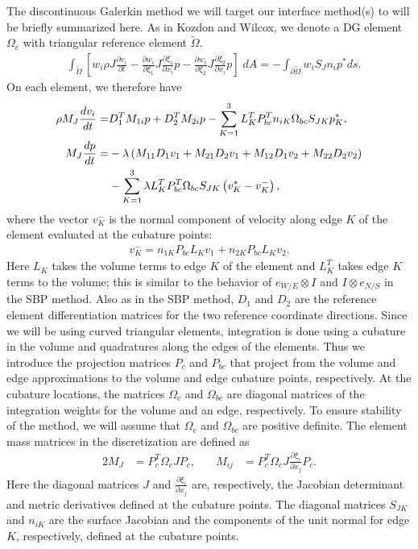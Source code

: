 The discontinuous Galerkin method we will target our interface method(s) to
will be briefly summarized here. As in Kozdon and Wilcox, we denote a DG
element $\Omega_e$ with triangular reference element $\tilde{\Omega}$.
\begin{align}
&\int_{\tilde{\Omega}} \left[ w_{i}\rho J \frac{\partial v_{i}}{\partial t}
- \frac{\partial w_{i}}{\partial \xi_{1}}J\frac{\partial \xi_{1}}{\partial x_{i}} p
- \frac{\partial w_{i}}{\partial \xi_{2}}J\frac{\partial \xi_{2}}{\partial x_{i}} p\right]\;dA
=
-\int_{\partial \tilde{\Omega}} w_{i} S_{J} n_{i} p^*ds.
\end{align}
On each element, we therefore have
\begin{align}
  \rho M_{J} \frac{d v_{i}}{dt} =&
  D_{1}^{T} M_{1i} p
  + D_{2}^{T} M_{2i} p
  - \sum_{K=1}^{3} L_{K}^{T} P_{bc}^{T} n_{iK}
  \Omega_{bc} S_{JK} p_{K}^{*},\\
  \notag
  M_{J} \frac{dp}{dt} =&
  -\lambda\left(
    M_{11} D_{1} v_{1}
    +
    M_{21} D_{2} v_{1}
    +
    M_{12} D_{1} v_{2}
    +
    M_{22} D_{2} v_{2}
  \right)\\
  &- \sum_{K=1}^{3}\lambda L_{K}^{T} P_{bc}^{T} \Omega_{bc}
  S_{JK} \left(v_{K}^* - v_{K}^{-}\right),
\end{align}
where the vector $v_{K}^{-}$ is the normal component of velocity along
edge $K$ of the element evaluated at the cubature points:
\begin{align}
  v^{-}_{K} = n_{1K} P_{bc} L_{K} v_{1}
    + n_{2K} P_{bc} L_{K} v_{2}.
\end{align}
Here $L_{K}$ takes the volume terms to edge $K$ of the element
and $L_{K}^{T}$ takes edge $K$ terms to the volume; this is similar
to the behavior of $e_{W/E} \otimes I$ and  $I \otimes
e_{N/S}$ in the SBP method.
Also as in the SBP method, $D_{1}$ and $D_{2}$ are the reference
element differentiation matrices for the two reference coordinate directions.
Since we will be using curved triangular elements, integration is done using
a cubature in the volume and quadratures along the edges of the elements.
Thus we introduce the projection matrices
$P_{c}$ and $P_{bc}$ that project from the volume and edge
approximations to the volume and edge cubature points, respectively. At the
cubature locations, the matrices $\Omega_{c}$ and $\Omega_{bc}$ are
diagonal matrices of the integration weights for the volume and an edge,
respectively.  To ensure stability of the method, we will assume that
$\Omega_{c}$ and $\Omega_{bc}$ are positive definite. The
element mass matrices in the discretization are defined as
\begin{alignat}{2}
  M_{J}  &= P_{c}^{T} \Omega_{c} J P_{c},\quad&
  M_{ij} &= P_{c}^{T} \Omega_{c} J
                  \frac{\partial \xi_{i}}{\partial x_{j}} P_{c}.
\end{alignat}
Here the diagonal matrices $J$ and $\frac{\partial \xi_{i}}{\partial x_{j}}$ are,
respectively, the Jacobian determinant and metric derivatives defined at the
cubature points. The diagonal matrices $S_{JK}$ and $n_{iK}$
are the surface Jacobian and the components of the unit normal for edge $K$,
respectively, defined at the cubature points.


